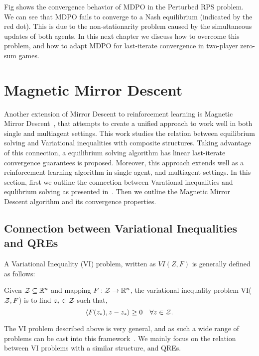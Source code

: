 
Fig  shows the convergence behavior of MDPO in the Perturbed RPS problem. 
We can see that MDPO fails to converge to a Nash equilibrium (indicated by the red dot).
This is due to the non-stationarity problem caused by the simultaneous updates of both agents.
In this next chapter we discuss how to overcome this problem, and how to adapt MDPO for last-iterate convergence in two-player zero-sum games.

\section[MMD]{Magnetic Mirror Descent}

Another extension of Mirror Descent to reinforcement learning is Magnetic Mirror Descent~\cite{sokotaUnified2023}, 
that attempts to create a unified approach to work well in both single and multiagent settings.
This work studies the relation between equilibrium solving and Variational inequalities with composite structures. 
Taking advantage of this connection, a equilibrium solving algorithm has linear last-iterate convergence guarantees is proposed. 
Moreover, this approach extends well as a reinforcement learning algorithm in single agent, and multiagent settings.
In this section, first we outline the connection between Varational inequalities and equlibrium solving as presented in~\cite{sokotaUnified2023}. 
Then we outline the Magnetic Mirror Descent algorithm and its convergence properties.

\subsection{Connection between Variational Inequalities and QREs}
A Variational Inequality (VI) problem, written as $VI(Z, F)$ is generally defined as follows:
\begin{definition}
	\label{def:vi}
	Given $\mathcal{Z}
		\subseteq \mathbb{R}^n$ and mapping $F: \mathcal{Z} \rightarrow \mathbb{R}^n$, the variational inequality problem VI($\mathcal{Z}, F$) 
		is to find $z_{\ast} \in \mathcal{Z}$ such that,
	\[ \langle F(z_{\ast}),
		z - z_{\ast} \rangle \geq 0 \quad \forall z \in \mathcal{Z}.
	\]
\end{definition}

The VI problem described above is very general, and as such a wide range of problems can be cast into this 
framework~\cite{facchineiFiniteDimensional2004}. We mainly focus on the relation between VI problems with a similar structure, 
and QREs.

